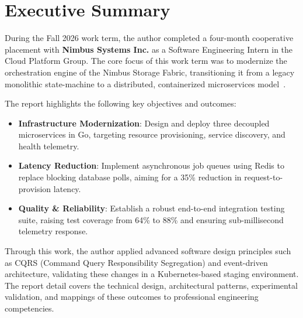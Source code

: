 \section{Executive Summary}
\label{sec:exec_summary}

During the Fall 2026 work term, the author completed a four-month cooperative placement with \textbf{Nimbus Systems Inc.} as a Software Engineering Intern in the Cloud Platform Group. The core focus of this work term was to modernize the orchestration engine of the Nimbus Storage Fabric, transitioning it from a legacy monolithic state-machine to a distributed, containerized microservices model~\cite{richardson2018microservices}.

The report highlights the following key objectives and outcomes:
\begin{itemize}
  \item \textbf{Infrastructure Modernization}: Design and deploy three decoupled microservices in Go, targeting resource provisioning, service discovery, and health telemetry.
  \item \textbf{Latency Reduction}: Implement asynchronous job queues using Redis to replace blocking database polls, aiming for a 35\% reduction in request-to-provision latency.
  \item \textbf{Quality \& Reliability}: Establish a robust end-to-end integration testing suite, raising test coverage from 64\% to 88\% and ensuring sub-millisecond telemetry response.
\end{itemize}

Through this work, the author applied advanced software design principles such as CQRS (Command Query Responsibility Segregation) and event-driven architecture, validating these changes in a Kubernetes-based staging environment. The report detail covers the technical design, architectural patterns, experimental validation, and mappings of these outcomes to professional engineering competencies.
